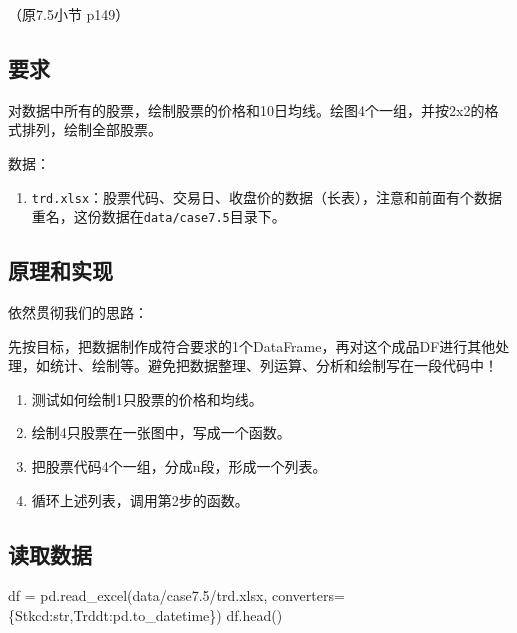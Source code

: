 \documentclass[
  letterpaper,
  DIV=11,
  numbers=noendperiod]{scrreprt}
\newenvironment{Shaded}{\begin{snugshade}}{\end{snugshade}}
\newcommand{\BuiltInTok}[1]{\textcolor[rgb]{0.00,0.23,0.31}{#1}}
\newcommand{\NormalTok}[1]{\textcolor[rgb]{0.00,0.23,0.31}{#1}}
\newcommand{\OperatorTok}[1]{\textcolor[rgb]{0.37,0.37,0.37}{#1}}
\newcommand{\StringTok}[1]{\textcolor[rgb]{0.13,0.47,0.30}{#1}}
\providecommand{\tightlist}{%
  \setlength{\itemsep}{0pt}\setlength{\parskip}{0pt}}\usepackage{longtable,booktabs,array}
\begin{document}
（原7.5小节 p149）

\hypertarget{ux8981ux6c42-3}{%
\subsection{要求}\label{ux8981ux6c42-3}}

对数据中所有的股票，绘制股票的价格和10日均线。绘图4个一组，并按2x2的格式排列，绘制全部股票。

数据：

\begin{enumerate}
\def\labelenumi{\arabic{enumi}.}
\tightlist
\item
  \texttt{trd.xlsx}：股票代码、交易日、收盘价的数据（长表），注意和前面有个数据重名，这份数据在\texttt{data/case7.5}目录下。
\end{enumerate}

\hypertarget{ux539fux7406ux548cux5b9eux73b0}{%
\subsection{原理和实现}\label{ux539fux7406ux548cux5b9eux73b0}}

依然贯彻我们的思路：

先按目标，把数据制作成符合要求的1个DataFrame，再对这个成品DF进行其他处理，如统计、绘制等。避免把数据整理、列运算、分析和绘制写在一段代码中！

\begin{enumerate}
\def\labelenumi{\arabic{enumi}.}
\tightlist
\item
  测试如何绘制1只股票的价格和均线。
\item
  绘制4只股票在一张图中，写成一个函数。
\item
  把股票代码4个一组，分成n段，形成一个列表。
\item
  循环上述列表，调用第2步的函数。
\end{enumerate}

\hypertarget{ux8bfbux53d6ux6570ux636e}{%
\subsection{读取数据}\label{ux8bfbux53d6ux6570ux636e}}

\begin{Shaded}
\begin{Highlighting}[]
\NormalTok{df }\OperatorTok{=}\NormalTok{ pd.read\_excel(}\StringTok{\textquotesingle{}data/case7.5/trd.xlsx\textquotesingle{}}\NormalTok{,}
\NormalTok{                    converters}\OperatorTok{=}\NormalTok{\{}\StringTok{\textquotesingle{}Stkcd\textquotesingle{}}\NormalTok{:}\BuiltInTok{str}\NormalTok{,}\StringTok{\textquotesingle{}Trddt\textquotesingle{}}\NormalTok{:pd.to\_datetime\})}
\NormalTok{df.head()}
\end{Highlighting}
\end{Shaded}
\end{document}
